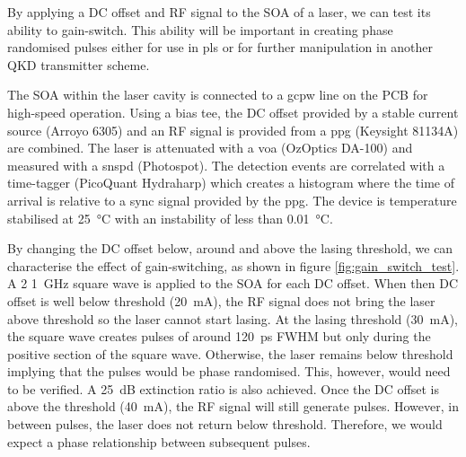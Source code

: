 By applying a DC offset and RF signal to the \ac{SOA} of a laser, we can test its ability to gain-switch. This ability will be important in creating phase randomised pulses either for use in \ac{pls} or for further manipulation in another \ac{QKD} transmitter scheme.


The \ac{SOA} within the laser cavity is connected to a \ac{gcpw} line on the PCB for high-speed operation. Using a bias tee, the DC offset provided by a stable current source (Arroyo 6305) and an RF signal is provided from a \ac{ppg} (Keysight 81134A) are combined. The laser is attenuated with a \ac{voa} (OzOptics DA-100) and measured with a \ac{snspd} (Photospot). The detection events are correlated with a time-tagger (PicoQuant Hydraharp) which creates a histogram where the time of arrival is relative to a sync signal provided by the \ac{ppg}. The device is temperature stabilised at \SI{25}{\celsius} with an instability of less than \SI{0.01}{\celsius}.


By changing the DC offset below, around and above the lasing threshold, we can characterise the effect of gain-switching, as shown in figure \ref{fig:gain_switch_test}. A \SI{2}{\Vpp} \SI{1}{GHz} square wave is applied to the SOA for each DC offset. When then DC offset is well below threshold (\SI{20}{\mA}), the RF signal does not bring the laser above threshold so the laser cannot start lasing. At the lasing threshold (\SI{30}{\mA}), the square wave creates pulses of around \SI{120}{ps} \ac{FWHM} but only during the positive section of the square wave. Otherwise, the laser remains below threshold implying that the pulses would be phase randomised. This, however, would need to be verified. A \SI{25}{dB} extinction ratio is also achieved. Once the DC offset is above the threshold (\SI{40}{\mA}), the RF signal will still generate pulses. However, in between pulses, the laser does not return below threshold. Therefore, we would expect a phase relationship between subsequent pulses.

